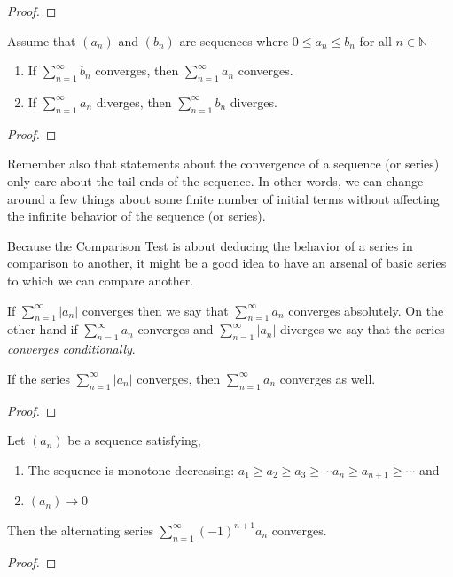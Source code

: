 	\begin{proof}  \end{proof}
	
	\begin{theorem}  Assume that $(a_n)$ and $(b_n)$ are sequences where $0 \leq a_n \leq b_n$  for all $n \in \mathbb{N}$
		\begin{enumerate}
			\item If $\sum_{n=1}^{\infty} b_n$ converges, then $\sum_{n=1}^{\infty} a_n$ converges.
			\item If $\sum_{n=1}^{\infty} a_n$ diverges, then $\sum_{n=1}^{\infty} b_n$ diverges.
		\end{enumerate}
	\end{theorem}
	
	
	
	\begin{proof}  \end{proof}
	
	Remember also that statements about the convergence of a sequence (or series) only care about the tail ends of the sequence.  In other words, we can change around a few things about some finite number of initial terms without affecting the infinite behavior of the sequence (or series).
	
	Because the Comparison Test is about deducing the behavior of a series in comparison to another, it might be a good idea to have an arsenal of basic series to which we can compare another. 
	
	  If $\sum_{n=1}^{\infty} |a_n|$ converges then we say that $\sum_{n=1}^{\infty} a_n$ converges absolutely.  On the other hand if $\sum_{n=1}^{\infty} a_n$ converges and $\sum_{n=1}^{\infty} |a_n|$ diverges we say that the series \emph{converges conditionally}.
	
	
	\begin{theorem}
	If the series $\sum_{n=1}^{\infty} |a_n|$ converges, then $\sum_{n=1}^{\infty} a_n$ converges as well.
	\end{theorem}  
	\begin{proof}  \end{proof}
	
	
	\begin{theorem}  Let $(a_n)$ be a sequence satisfying,
	
	\begin{enumerate}
		\item The sequence is monotone decreasing:  $a_1 \geq a_2 \geq a_3 \geq \cdots a_n \geq a_{n+1} \geq \cdots $ and
		\item $(a_n) \to 0$
	\end{enumerate}
	
	
	Then the alternating series $\sum_{n=1}^{\infty} (-1)^{n+1} a_n$ converges.
	\end{theorem}
	\begin{proof}  \end{proof}
	
